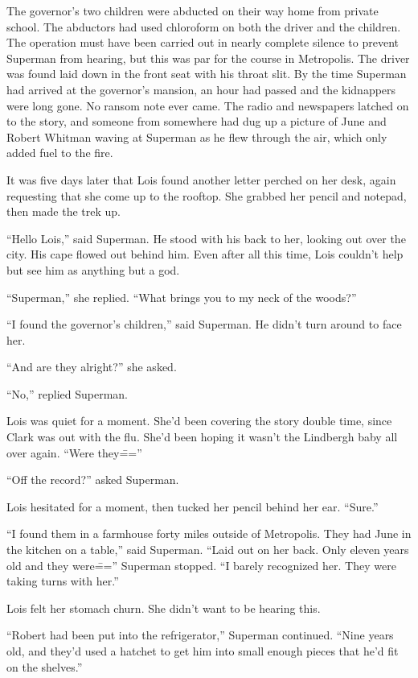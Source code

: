 \documentclass[ebook,12pt]{memoir}
\begin{document}
The governor's two children were abducted on their way home from private
school. The abductors had used chloroform on both the driver and the
children. The operation must have been carried out in nearly complete
silence to prevent Superman from hearing, but this was par for the
course in Metropolis. The driver was found laid down in the front seat
with his throat slit. By the time Superman had arrived at the governor's
mansion, an hour had passed and the kidnappers were long gone. No ransom
note ever came. The radio and newspapers latched on to the story, and
someone from somewhere had dug up a picture of June and Robert Whitman
waving at Superman as he flew through the air, which only added fuel to
the fire.

It was five days later that Lois found another letter perched on her
desk, again requesting that she come up to the rooftop. She grabbed her
pencil and notepad, then made the trek up.

``Hello Lois,'' said Superman. He stood with his back to her, looking
out over the city. His cape flowed out behind him. Even after all this
time, Lois couldn't help but see him as anything but a god.

``Superman,'' she replied. ``What brings you to my neck of the woods?''

``I found the governor's children,'' said Superman. He didn't turn
around to face her.

``And are they alright?'' she asked.

``No,'' replied Superman.

Lois was quiet for a moment. She'd been covering the story double time,
since Clark was out with the flu. She'd been hoping it wasn't the
Lindbergh baby all over again. ``Were they\===''

``Off the record?'' asked Superman.

Lois hesitated for a moment, then tucked her pencil behind her ear.
``Sure.''

``I found them in a farmhouse forty miles outside of Metropolis. They
had June in the kitchen on a table,'' said Superman. ``Laid out on her
back. Only eleven years old and they were\==='' Superman stopped. ``I
barely recognized her. They were taking turns with her.''

Lois felt her stomach churn. She didn't want to be hearing this.

``Robert had been put into the refrigerator,'' Superman continued.
``Nine years old, and they'd used a hatchet to get him into small enough
pieces that he'd fit on the shelves.''
\end{document}

